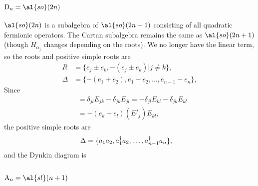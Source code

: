 \subsubsection{$\text{D}_n = \al{so}(2n)$}

$\al{so}(2n)$ is a subalgebra of $\al{so}(2n+1)$ consisting of all quadratic fermionic operators. The Cartan subalgebra remains the same as $\al{so}(2n+1)$ (though $H_{\alpha_j}$ changes depending on the roots). We no longer have the linear term, so the roots and positive simple roots are
\begin{align}
R &= \{ e_j \pm e_k, -(e_j \pm e_k) |j \neq k \}, \\
\Delta &= \{-(e_1 + e_2), e_1 - e_2, \dots, e_{n-1} - e_n \},
\end{align}
Since
\begin{align}
	[E^j{}_j, E_{kl}] &= \delta_{jl} E_{jk} - \delta_{jk} E_{jl}
	= - \delta_{jl} E_{kl} - \delta_{jk} E_{kl}  \nonumber \\
	&= -(e_k + e_l) (E^j{}_j) E_{kl},
\end{align}
the positive simple roots are
\begin{align}
\Delta &= \{a_1a_2, a_1^{\dagger} a_2, \dots, a_{n-1}^{\dagger} a_n \},
\end{align}
and the Dynkin diagram is
\begin{center}
\end{center}

\subsubsection{$\text{A}_n = \al{sl}(n+1)$}

